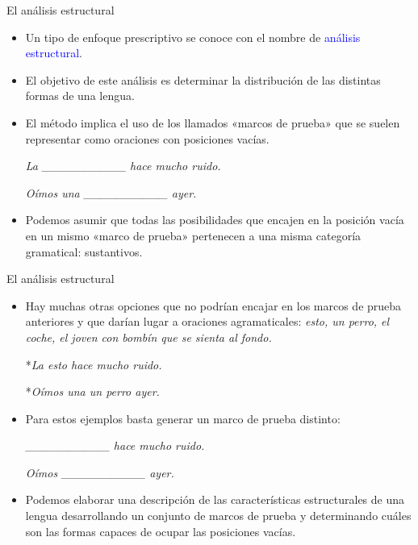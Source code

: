 \documentclass{beamer}
\begin{document}
\begin{frame}{El análisis estructural}

\begin{itemize}
	\item Un tipo de enfoque prescriptivo se conoce con el nombre de \textcolor{blue}{análisis estructural}.
	\item El objetivo de este análisis es determinar la distribución de las distintas formas de una lengua.
	\item El método implica el uso de los llamados «marcos de prueba» que se suelen representar como oraciones con posiciones vacías.
	
	\it{La \_\_\_\_\_\_\_\_\_\_ hace mucho ruido.}

	\it{Oímos una \_\_\_\_\_\_\_\_\_\_ ayer.}

	\item Podemos asumir que todas las posibilidades que encajen en la posición vacía en un mismo «marco de prueba» pertenecen a una misma categoría gramatical: sustantivos.
\end{itemize}

\end{frame}

\begin{frame}{El análisis estructural}

\begin{itemize}
	\item Hay muchas otras opciones que no podrían encajar en los marcos de prueba anteriores y que darían lugar a oraciones agramaticales: \it{esto, un perro, el coche, el joven con bombín que se sienta al fondo}.
	
	*\it{La esto hace mucho ruido.}

	*\it{Oímos una un perro ayer.}

	\item Para estos ejemplos basta generar un marco de prueba distinto: 
	
	\it{\_\_\_\_\_\_\_\_\_\_ hace mucho ruido.}

	\it{Oímos \_\_\_\_\_\_\_\_\_\_ ayer.}

	\item Podemos elaborar una descripción de las características estructurales de una lengua desarrollando un conjunto de marcos de prueba y determinando cuáles son las formas capaces de ocupar las posiciones vacías. 
\end{itemize}

\end{frame}
\end{document}
